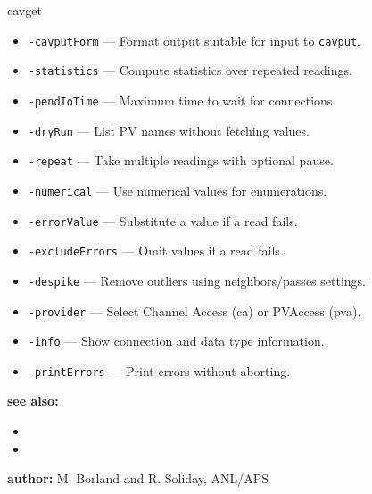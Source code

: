 \begin{sddsprog}{cavget}
\begin{itemize}
    \item {\tt -cavputForm} --- Format output suitable for input to \verb+cavput+.
    \item {\tt -statistics} --- Compute statistics over repeated readings.
    \item {\tt -pendIoTime} --- Maximum time to wait for connections.
    \item {\tt -dryRun} --- List PV names without fetching values.
    \item {\tt -repeat} --- Take multiple readings with optional pause.
    \item {\tt -numerical} --- Use numerical values for enumerations.
    \item {\tt -errorValue} --- Substitute a value if a read fails.
    \item {\tt -excludeErrors} --- Omit values if a read fails.
    \item {\tt -despike} --- Remove outliers using neighbors/passes settings.
    \item {\tt -provider} --- Select Channel Access (ca) or PVAccess (pva).
    \item {\tt -info} --- Show connection and data type information.
    \item {\tt -printErrors} --- Print errors without aborting.
  \end{itemize}
\item \textbf{see also:}
  \begin{itemize}
    \item {}
    \item {}
  \end{itemize}
\item \textbf{author:} M. Borland and R. Soliday, ANL/APS
\end{sddsprog}
